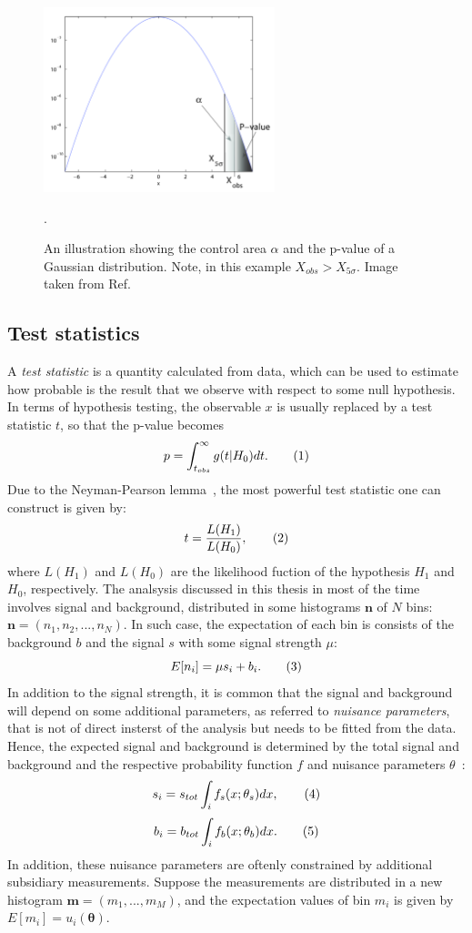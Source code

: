 \begin{figure}[htbp]
    \centering
    \includegraphics[width=0.6\textwidth]{theory/plots/pvalue.png}
    \caption{An illustration showing the control area $\alpha$ and the p-value of a Gaussian distribution. Note, in this 
    example $X_{obs} > X_{5\sigma}$. Image taken from Ref.\cite{Stats-for-pedestrian}}.
    \label{fig:stats:pvalue}
\end{figure}









\subsection{Test statistics}
A \textit{test statistic} is a quantity calculated from data,
which can be used to estimate how probable is the result 
that we observe with respect to some null hypothesis.
In terms of hypothesis testing, the observable $x$ is usually replaced by 
a test statistic $t$, so that the p-value becomes
\[
p = \int_{t_{obs}}^\infty g(t|H_0) dt.
\addtag \]
Due to the Neyman-Pearson lemma~\cite{Neyman-Pearson}, the most powerful test statistic
one can construct is given by:
\[
t  = \frac{L(H_1)}{L(H_0)},
\addtag \]
where $L(H_1)$ and $L(H_0)$ are the likelihood fuction of the hypothesis $H_1$ and $H_0$, respectively.
The analsysis discussed in this thesis in most of the time involves
signal and background, distributed in some histograms $\mathbf{n}$ of $N$ bins:
$\mathbf{n}  = (n_1, n_2, ... , n_N)$. In such case, 
the expectation of each bin is consists of the background $b$ and the signal $s$ with some signal
strength $\mu$:
\[
    E[n_i] = \mu s_i + b_i.
\addtag \]
In addition to the signal strength, it is common that the signal and background will depend
on some additional parameters, as referred to \textit{nuisance parameters}, that is
not of direct insterst of the analysis but needs to be fitted from the data. 
Hence, the expected signal and background is determined by the 
total signal and background and the respective probability function $f$ and 
nuisance parameters $\theta$~\cite{Glen-Cowan}:
\[
s_i = s_{tot} \int_i f_s(x;\mathbf{\theta}_s ) dx,
\addtag \]
\[
b_i = b_{tot} \int_i f_b(x;\mathbf{\theta}_b ) dx.
\addtag \]
In addition, these nuisance parameters are oftenly constrained by additional subsidiary measurements.
Suppose the measurements are distributed in a new histogram $\mathbf{m} = (m_1, ..., m_M)$,
and the expectation values of bin $m_i$ is given by $E[m_i] = u_i(\mathbf{\theta})$.

